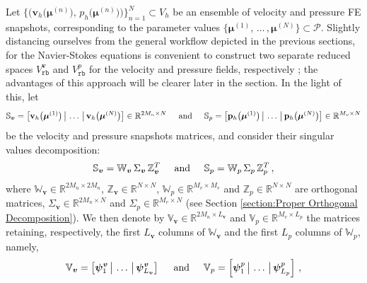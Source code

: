 \documentclass[12pt, a4paper, twoside, openright]{report}
\numberwithin{equation}{chapter}
\theoremstyle{theorem}
\theoremstyle{definition}
\theoremstyle{remark}
\theoremstyle{proposition}
\numberwithin{figure}{chapter}
\newcommand{\bg}[1]{\boldsymbol{#1}}
\begin{document}
		Let $\big\lbrace \big( \bg{v}_h \big( \bg{\mu}^{(n)} \big), \, p_h \big( \bg{\mu}^{(n)} \big) \big) \big\rbrace_{n = 1}^N \subset V_h$ be an ensemble of velocity and pressure FE snapshots, corresponding to the parameter values $\big\lbrace \bg{\mu}^{(1)}, \, \ldots \, , \bg{\mu}^{(N)} \big\rbrace \subset \mathcal{P}$. Slightly distancing ourselves from the general workflow depicted in the previous sections, for the Navier-Stokes equations is convenient to construct two separate reduced spaces $V_{\texttt{rb}}^{\bg{v}}$ and $V_{\texttt{rb}}^{p}$ for the velocity and pressure fields, respectively \cite{Bal14, Bur06, Chen17, QMN15}; the advantages of this approach will be clearer later in the section. In the light of this, let 
		\begin{equation*}
			\mathbb{S}_{\bg{v}} = \big[ \mathbf{v}_h \big( \bg{\mu}^{(1)} \big) \, \big| \, \ldots \, \big| \, \mathbf{v}_h \big( \bg{\mu}^{(N)} \big) \big] \in \mathbb{R}^{2 M_n \times N} \hspace*{0.5cm} \text{and} \hspace*{0.5cm} \mathbb{S}_{p} = \big[ \mathbf{p}_h \big( \bg{\mu}^{(1)} \big) \, \big| \, \ldots \, \big| \, \mathbf{p}_h \big( \bg{\mu}^{(N)} \big) \big] \in \mathbb{R}^{M_v \times N}
		\end{equation*}
		be the velocity and pressure snapshots matrices, and consider their singular values decomposition:
		\begin{equation*}
			\mathbb{S}_{\bg{v}} = \mathbb{W}_{\bg{v}} \, \Sigma_{\bg{v}} \, \mathbb{Z}_{\bg{v}}^T \hspace*{0.5cm} \text{and} \hspace*{0.5cm} \mathbb{S}_{p} = \mathbb{W}_{p} \, \Sigma_{p} \, \mathbb{Z}_{p}^T \, ,
		\end{equation*}
		where $\mathbb{W}_{\bg{v}} \in \mathbb{R}^{2 M_n \times 2 M_n}$, $\mathbb{Z}_{\bg{v}} \in \mathbb{R}^{N \times N}$, $\mathbb{W}_{p} \in \mathbb{R}^{M_v \times M_v}$ and $\mathbb{Z}_{p} \in \mathbb{R}^{N \times N}$ are orthogonal matrices, $\Sigma_{\bg{v}} \in \mathbb{R}^{2 M_n \times N}$ and $\Sigma_{p} \in \mathbb{R}^{M_v \times N}$ (see Section \ref{section:Proper Orthogonal Decomposition}). We then denote by $\mathbb{V}_{\bg{v}} \in \mathbb{R}^{2 M_n \times L_{\bg{v}}}$ and $\mathbb{V}_{p} \in \mathbb{R}^{M_v \times L_p}$ the matrices retaining, respectively, the first $L_{\bg{v}}$ columns of $\mathbb{W}_{\bg{v}}$ and the first $L_p$ columns of $\mathbb{W}_p$, namely,
		\begin{equation*}
			\mathbb{V}_{\bg{v}} = \left[ \bg{\psi}_1^{\bg{v}} \, \big| \, \ldots \, \big| \, \bg{\psi}_{L_{\bg{v}}}^{\bg{v}} \right] \hspace*{0.5cm} \text{and} \hspace*{0.5cm} \mathbb{V}_{p} = \left[ \bg{\psi}_1^{p} \, \big| \, \ldots \, \big| \, \bg{\psi}_{L_{p}}^{p} \right] \, ,
		\end{equation*}
\end{document}
